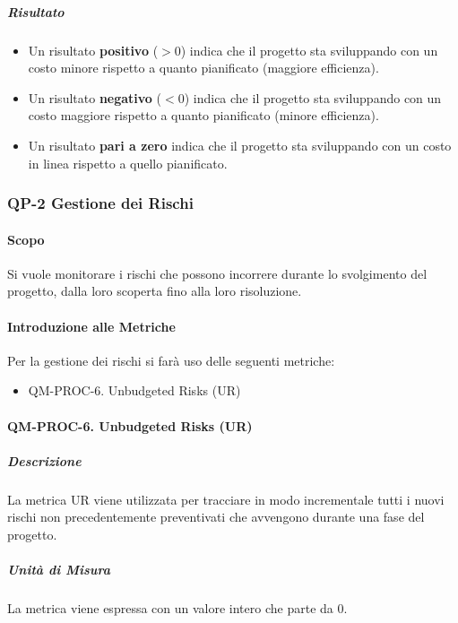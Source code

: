			\subparagraph{Risultato}
			\begin{itemize}
				\item Un risultato \textbf{positivo} (\(> 0\)) indica che il progetto sta sviluppando con un costo minore rispetto a quanto pianificato (maggiore efficienza).
				\item Un risultato \textbf{negativo} (\(< 0\)) indica che il progetto sta sviluppando con un costo maggiore rispetto a quanto pianificato (minore efficienza).
				\item Un risultato \textbf{pari a zero} indica che il progetto sta sviluppando con un costo in linea rispetto a quello pianificato.
			\end{itemize}
	
	\subsubsection{QP-2 Gestione dei Rischi}

		\paragraph{Scopo}
		
		Si vuole monitorare i rischi che possono incorrere durante lo svolgimento del progetto, dalla loro scoperta fino alla loro risoluzione.

		\paragraph{Introduzione alle Metriche}

		Per la gestione dei rischi si farà uso delle seguenti metriche:

		\begin{itemize}
			\item QM-PROC-6. Unbudgeted Risks (UR)
		\end{itemize}

		\paragraph{QM-PROC-6. Unbudgeted Risks (UR)}

			\subparagraph{Descrizione}
			La metrica UR viene utilizzata per tracciare in modo incrementale tutti i nuovi rischi non precedentemente preventivati che avvengono durante una fase del progetto.

			\subparagraph{Unità di Misura}
			La metrica viene espressa con un valore intero che parte da 0.

